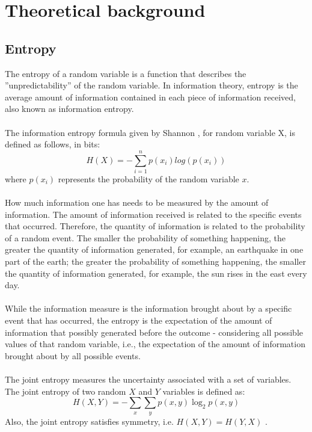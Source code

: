 



\chapter{Theoretical background}

\section{Entropy}

The entropy of a random variable is a function that describes the ''unpredictability'' of the random variable. In information theory, entropy is the average amount of information contained in each piece of information received, also known as information entropy. \cite{shannon1948mathematical,PATHRIA201139}
\\ \hspace*{\fill} \\
 The information entropy formula given by Shannon \cite{shannon1948mathematical} , for random variable X, is defined as follows, in bits: \\
\begin{equation}
H(X) = - \sum_{i=1}^{n}p(x_{i}) log(p(x_{i}) )  
\end{equation} 
where $p(x_{i})$ represents the probability of the random variable $x$.
\\ \hspace*{\fill} \\
How much information one has needs to be measured by the amount of information. The amount of information received is related to the specific events that occurred. Therefore, the quantity of information is related to the probability of a random event. The smaller the probability of something happening, the greater the quantity of information generated, for example, an earthquake in one part of the earth; the greater the probability of something happening, the smaller the quantity of information generated, for example, the sun rises in the east every day.
\\ \hspace*{\fill} \\
While the information measure is the information brought about by a specific event that has occurred, the entropy is the expectation of the amount of information that possibly generated before the outcome - considering all possible values of that random variable, i.e., the expectation of the amount of information brought about by all possible events.
\\ \hspace*{\fill} \\
The joint entropy measures the uncertainty associated with a set of variables. The joint entropy of two random $X$ and $Y$ variables is defined as: \cite{cover1999elements}
\begin{equation}
H(X,Y) = - \sum_{x}\sum_{y}p(x,y)\log_{2}{p(x,y)}   
\end{equation} 
 Also, the joint entropy satisfies symmetry, i.e. $H(X,Y) = H(Y,X)$ .\\
 
